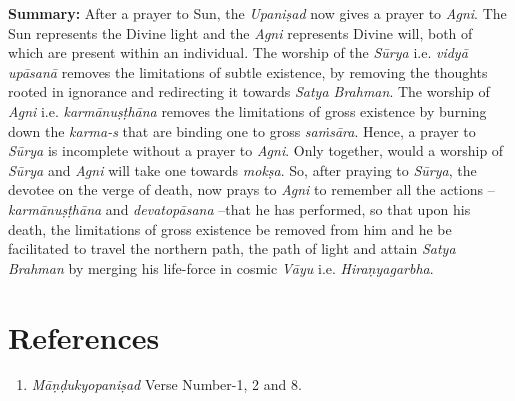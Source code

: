 \textbf{Summary:} After a prayer to Sun, the \emph{Upaniṣad} now gives a prayer to \emph{Agni}. The Sun represents the Divine light and the \emph{Agni} represents Divine will, both of which are present within an individual. The worship of the \emph{Sūrya} i.e. \emph{vidyā upāsanā} removes the limitations of subtle existence, by removing the thoughts rooted in ignorance and redirecting it towards \emph{Satya Brahman}. The worship of \emph{Agni} i.e. \emph{karmānuṣṭhāna} removes the limitations of gross existence by burning down the \emph{karma-s} that are binding one to gross \emph{saṁsāra}. Hence, a prayer to \emph{Sūrya} is incomplete without a prayer to \emph{Agni}. Only together, would a worship of \emph{Sūrya} and \emph{Agni} will take one towards \emph{mokṣa}. So, after praying to \emph{Sūrya}, the devotee on the verge of death, now prays to \emph{Agni} to remember all the actions -- \emph{karmānuṣṭhāna} and \emph{devatopāsana} --that he has performed, so that upon his death, the limitations of gross existence be removed from him and he be facilitated to travel the northern path, the path of light and attain \emph{Satya Brahman} by merging his life-force in cosmic \emph{Vāyu} i.e. \emph{Hiraṇyagarbha}.

\section*{References}

\begin{enumerate}
\item
  \emph{Māṇḍukyopaniṣad} Verse Number-1, 2 and 8.
\end{enumerate}


